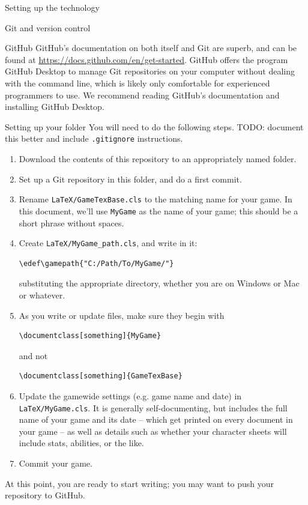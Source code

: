 \documentclass[sheet]{GameTexBase}
\begin{document}
\begin{section}{Setting up the technology}
\begin{subsection}{Git and version control}
\begin{subsubsection}{GitHub}
GitHub's documentation on both itself and Git are superb, and can be found at \url{https://docs.github.com/en/get-started}.  GitHub offers the program GitHub Desktop to manage Git repositories on your computer without dealing with the command line, which is likely only comfortable for experienced programmers to use.  We recommend reading GitHub's documentation and installing GitHub Desktop.
\end{subsubsection}
\end{subsection}
\begin{subsection}{Setting up your \gametex{} folder}
You will need to do the following steps.  TODO: document this better and include \lstinline|.gitignore| instructions.
\begin{enumerate}
\item Download the contents of this repository to an appropriately named folder.
\item Set up a Git repository in this folder, and do a first commit.
\item Rename \lstinline|LaTeX/GameTexBase.cls| to the matching name for your game.  In this document, we'll use \lstinline|MyGame| as the name of your game; this should be a short phrase without spaces.
\item Create \lstinline|LaTeX/MyGame_path.cls|, and write in it:
\begin{verbatim}
\edef\gamepath{"C:/Path/To/MyGame/"}
\end{verbatim}
substituting the appropriate directory, whether you are on Windows or Mac or whatever.
\item As you write or update files, make sure they begin with
\begin{verbatim}
\documentclass[something]{MyGame}
\end{verbatim}
and not
\begin{verbatim}
\documentclass[something]{GameTexBase}
\end{verbatim}
\item Update the gamewide settings (e.g. game name and date) in \lstinline|LaTeX/MyGame.cls|.  It is generally self-documenting, but includes the full name of your game and its date -- which get printed on every document in your game -- as well as details such as whether your character sheets will include stats, abilities, or the like.
\item Commit your game.
\end{enumerate}
At this point, you are ready to start writing; you may want to push your repository to GitHub.
\end{subsection}
\end{section}
\end{document}
